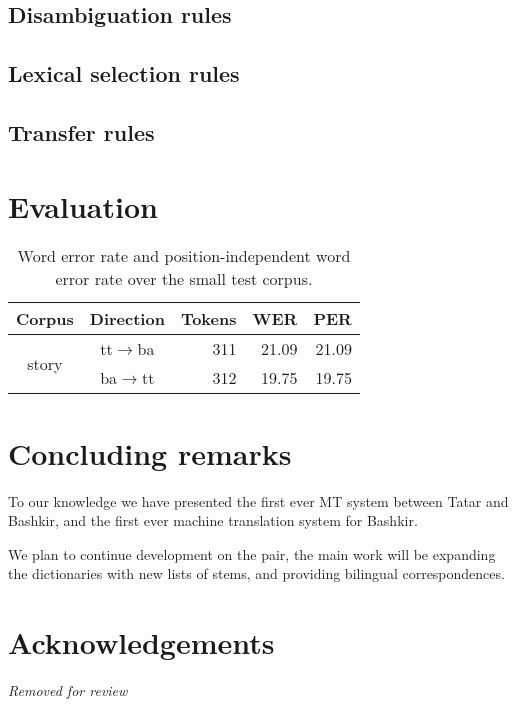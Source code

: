 \documentclass[11pt,a4paper]{article}
\begin{document}
\subsection{Disambiguation rules}



\subsection{Lexical selection rules}



\subsection{Transfer rules}

\section{Evaluation}
\label{sec:eval}

\begin{table*}
  \begin{center}
  \begin{tabular}{c|c|r|r|r}
   Corpus                 & Direction         & Tokens  & WER    & PER    \\
  \hline
   \multirow{2}{*}{story} & tt$\rightarrow$ba & 311 & 21.09  & 21.09 \\
                          & ba$\rightarrow$tt & 312 & 19.75  & 19.75 \\
  \hline
  \end{tabular}
    \caption{Word error rate and position-independent word error rate over the small test corpus.}
    \label{table:wer}
  \end{center}
\end{table*}



\cite{TyersAlperen2010}

\section{Concluding remarks}
\label{sec:conc}

To our knowledge we have presented the first ever MT system between
Tatar and Bashkir, and the first ever machine translation system
for Bashkir.

We plan to continue development on the pair, the main work will be 
expanding the dictionaries with new lists of stems, and providing 
bilingual correspondences.


\section*{Acknowledgements}

{\em Removed for review}



\end{document}
